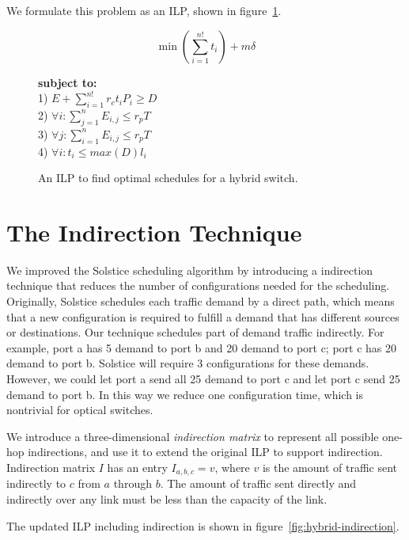 We formulate this problem as an ILP, shown in figure~\ref{fig:hybrid-optimization}.

\begin{figure}[t]
\small
\centering
\begin{mdframed}
\[
\min \left(\sum_{i=1}^{n!} t_i\right) + m\delta
\]
\begin{tabbing}
\textbf{subject to:}\\[4pt]
1) $E + \sum_{i=1}^{n!} r_c t_i P_i \geq D$\\[4pt]
2) $\forall i: \sum_{j=1}^{n} E_{i,j} \leq r_p T$\\[4pt]
3) $\forall j: \sum_{i=1}^{n} E_{i,j} \leq r_p T$\\[4pt]
4) $\forall i: t_i \leq \textit{max}(D) l_i$
\end{tabbing}
\end{mdframed}
\caption{An ILP to find optimal schedules for a hybrid switch.}
\label{fig:hybrid-optimization}
\end{figure}

\section{The Indirection Technique}
\label{sec:indirection}
We improved the Solstice scheduling
algorithm by introducing a indirection technique that reduces the number
of configurations needed for the scheduling. Originally, Solstice
schedules each traffic demand by a direct path, which means that a new
configuration is required to fulfill a demand that has different sources
or destinations. Our technique schedules part of demand traffic
indirectly. For example, port a has 5 demand to port b and 20
demand to port c; port c has 20 demand to port b. Solstice will require
3 configurations for these demands. However, we could let port a send
all 25 demand to port c and let port c send 25 demand to port b. In this
way we reduce one configuration time, which is nontrivial for optical
switches. 

We introduce a three-dimensional {\it indirection matrix} to represent all possible one-hop
indirections, and use it to extend the original ILP to support indirection. Indirection matrix
$I$ has an entry $I_{a,b,c} = v$, where $v$ is the amount of traffic sent indirectly to $c$ from $a$
through $b$. The amount of traffic sent directly and indirectly over any link must be less than
the capacity of the link.


The updated ILP including indirection is shown in figure~\ref{fig:hybrid-indirection}.

